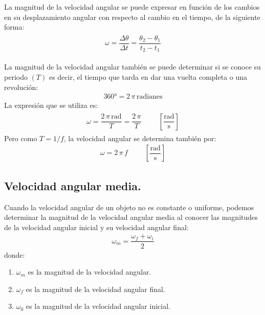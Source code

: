 \documentclass[14pt]{extarticle}
\begin{document}
La magnitud de la velocidad angular se puede expresar en función de los cambios en su desplazamiento angular con respecto al cambio en el tiempo, de la siguiente forma:
\begin{eqnarray*}
\begin{aligned}
\omega = \dfrac{\Delta \theta}{\Delta t} =  \dfrac{\theta_{2} - \theta_{1}}{t_{2} - t_{1}}
\end{aligned}
\end{eqnarray*}

La magnitud de la velocidad angular también se puede determinar si se conoce su periodo $(T)$ es decir, el tiempo que tarda en dar una vuelta completa o una revolución:
\begin{align*}
\ang{360}  = 2 \, \pi \, \text{radianes}
\end{align*}
La expresión que se utiliza es:
\begin{eqnarray*}
\begin{aligned}
\omega = \dfrac{2 \, \pi \, \text{rad}}{T} =  \dfrac{2 \, \pi}{T} \hspace{1cm} \left[ \dfrac{\text{rad}}{\unit{\second}} \right]
\end{aligned}
\end{eqnarray*}
Pero como $T = 1 / f$, la velocidad angular se determina también por:
\begin{align*}
\omega = 2 \, \pi \, f \hspace{1cm} \left[ \dfrac{\text{rad}}{\unit{\second}} \right]
\end{align*}

\subsection{Velocidad angular media.}

Cuando la velocidad angular de un objeto no es constante o uniforme, podemos determinar la magnitud de la velocidad angular media al conocer las magnitudes de la velocidad angular inicial y su velocidad angular final:
\begin{align*}
\omega_{m} = \dfrac{\omega_{f} + \omega_{i}}{2}
\end{align*}
donde:
\begin{enumerate}[label=\roman*)]
\item $\omega_{m}$ es la magnitud de la velocidad angular.
\item $\omega_{f}$ es la magnitud de la velocidad angular final.
\item $\omega_{0}$ es la magnitud de la velocidad angular inicial.
\end{enumerate}
\end{document}
